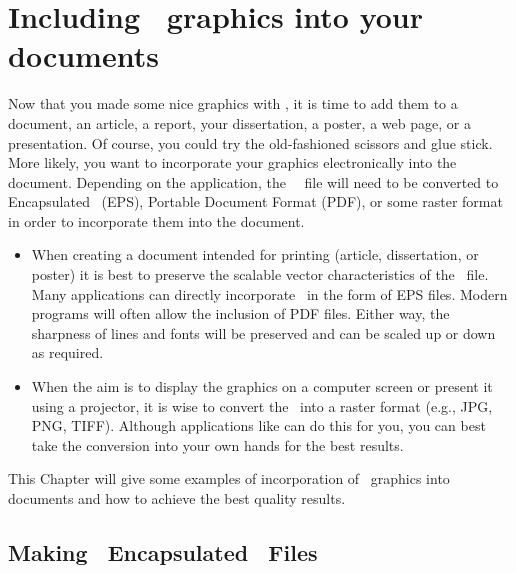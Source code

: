 %
%

\chapter{Including \gmt\ graphics into your documents}
\thispagestyle{headings}
\label{app:C}

Now that you made some nice graphics with \GMT, it is time to add them to a document, an article, a report, your dissertation, a poster, a web page, or a presentation. Of course, you could try the old-fashioned scissors and glue stick. More likely, you want to incorporate your graphics electronically into the document. Depending on the application, the \GMT\ \PS\ file will need to be converted to Encapsulated \PS\ (EPS), Portable Document Format (PDF), or some raster format in order to incorporate them into the document.
\begin{itemize}
\item When creating a document intended for printing (article, dissertation, or poster) it is best to preserve the scalable vector characteristics of the \PS\ file. Many applications can directly incorporate \PS\ in the form of EPS files. Modern programs will often allow the inclusion of PDF files. Either way, the sharpness of lines and fonts will be preserved and can be scaled up or down as required.
\item When the aim is to display the graphics on a computer screen or present it using a projector, it is wise to convert the \PS\ into a raster format (e.g., JPG, PNG, TIFF). Although applications like  can do this for you, you can best take the conversion into your own hands for the best results.
\end{itemize} 
This Chapter will give some examples of incorporation of \GMT\ graphics into documents and how to achieve the best quality results.

\section{Making \gmt\ Encapsulated \PS\ Files}

